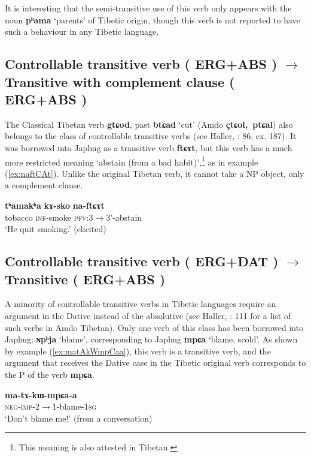 \documentclass[oneside,a4paper,11pt]{article}
\makeatletter
\newcommand{\ipa}[1]{{\phon\textbf{\mbox{#1}}}} %
\newcommand{\refb}[1]{(\ref{#1})}
\def\fakesc#1{%
  \begingroup%
  \xdef\fake@name{\csname\curr@fontshape/\f@size\endcsname}%
  \fontsize{\fontdimen8\fake@name}{\baselineskip}\selectfont%
  \uppercase{#1}%
  \endgroup%
}
\makeatother
\begin{document}
It is interesting that the semi-transitive use of this verb only appears with the noun \ipa{pʰama} `parents' of Tibetic origin, though this verb is not reported to have such a behaviour in any Tibetic language.



\subsection{Controllable transitive verb (\fakesc{erg+abs})  $\rightarrow$ Transitive with complement clause (\fakesc{erg+abs})}
The Classical Tibetan verb \ipa{gtɕod}, past \ipa{btɕad} `cut' (Amdo \ipa{çtɕol, ptɕal}) also belongs to the class of controllable transitive verbs (see Haller, \citeyear{haller04themchen}: 86, ex. 187). It was borrowed into Japhug as a transitive verb \ipa{ftɕɤt}, but this verb has a much more restricted meaning `abstain (from a bad habit)',\footnote{This meaning is also attested in Tibetan.} as in example \refb{ex:naftCAt}. Unlike the original Tibetan verb, it cannot take a NP object, only a complement clause.

\begin{exe}
\ex \label{ex:naftCAt}
\gll
\ipa{tʰamakʰa} \ipa{kɤ-sko} \ipa{na-ftɕɤt}\\
tobacco \textsc{inf}-smoke \textsc{pfv}:3$\rightarrow$3'-abstain \\
\glt `He quit smoking.' (elicited)
\end{exe}

\subsection{Controllable transitive verb (\fakesc{erg+dat})  $\rightarrow$ Transitive (\fakesc{erg+abs}) }
A minority of controllable transitive verbs in Tibetic languages require an argument in the Dative instead of the absolutive (see Haller, \citeyear{haller04themchen}: 111 for a list of such verbs in Amdo Tibetan). Only one verb of this class has been borrowed into Japhug: \ipa{ɴpʰja} `blame', corresponding to Japhug \ipa{mpɕa} `blame, scold'. As shown by example \refb{ex:matAkWmpCaa}, this verb is a transitive verb, and the argument that receives the Dative case in the Tibetic original verb corresponds to the P of the verb \ipa{mpɕa}.

\begin{exe}
\ex \label{ex:matAkWmpCaa}
\gll
  \ipa{ma-tɤ-kɯ-mpɕa-a} \\
  \textsc{neg-imp}-2$\rightarrow$1-blame-\textsc{1sg} \\
\glt `Don't blame me!' (from a conversation)
\end{exe}
  
\end{document}
